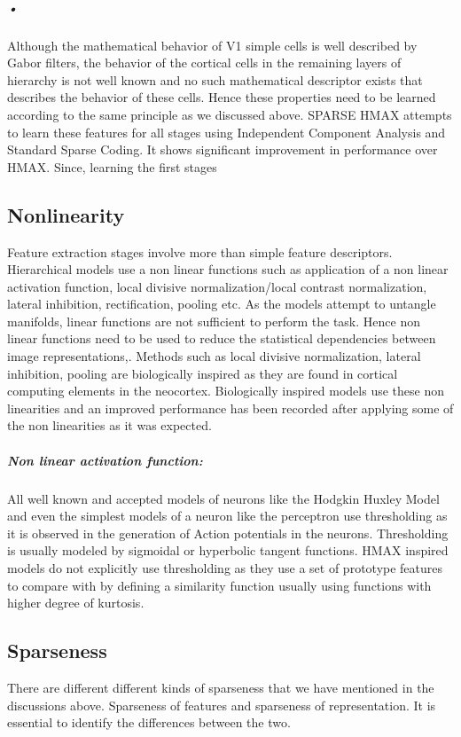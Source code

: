 \documentclass[12pt,twoside]{article}
\theoremstyle{plain}
\theoremstyle{definition}
\theoremstyle{remark}
\begin{document}
\subparagraph{•}
Although the mathematical behavior of V1 simple cells is well described by Gabor filters, the behavior of the cortical cells in the remaining layers of hierarchy is not well known and no such mathematical descriptor exists that describes the behavior of these cells. Hence these properties need to be learned according to the same principle as we discussed above. SPARSE HMAX\cite{XiaolinHu2014} attempts to learn these features for all stages using Independent Component Analysis and Standard Sparse Coding\cite{XiaolinHu2014}. It shows significant improvement in performance over HMAX\cite{MaximilianRiesenhuber1999}. Since, learning the first stages 

\subsection{Nonlinearity}
\label{Subsec: Nonlinear} Feature extraction stages involve more than simple feature descriptors. Hierarchical models use a non linear functions such as application of a non linear activation function, local divisive normalization/local contrast normalization, lateral inhibition, rectification, pooling etc. As the models attempt to untangle manifolds, linear functions are not sufficient to perform the task. Hence non linear functions need to be used to reduce the statistical dependencies between image representations\cite{Bethge2006},. Methods such as local divisive normalization, lateral inhibition, pooling are biologically inspired as they are found in cortical computing elements in the neocortex. Biologically inspired models use these non linearities and an improved performance has been recorded after applying some of the non linearities as it was expected. \subparagraph{Non linear activation function: }All well known and accepted models of neurons like the Hodgkin Huxley Model\cite{Hodgkin1952} and even the simplest models of a neuron like the perceptron\cite{Rosenblatt1957} use thresholding as it is observed in the generation of Action potentials in the neurons. Thresholding is usually modeled by sigmoidal or hyperbolic tangent functions. HMAX inspired models do not explicitly use thresholding as they use a set of prototype features to compare with by defining a similarity function usually using functions with higher degree of kurtosis. 

\subsection{Sparseness}
\label{Subsec:Sparsness}
There are different different kinds of sparseness that we have mentioned in the discussions above. Sparseness of features and sparseness of representation. It is essential to identify the differences between the two. 
\end{document}
